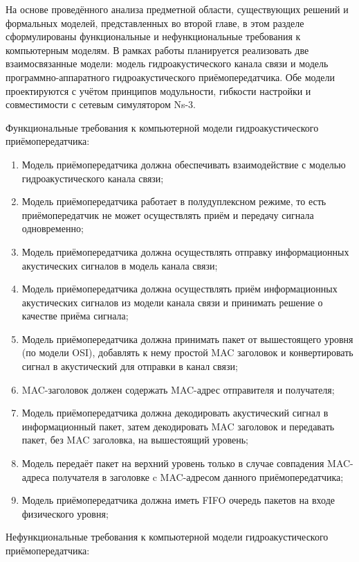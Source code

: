 На основе проведённого анализа предметной области, существующих решений
и формальных моделей, представленных во второй главе, в этом разделе
сформулированы функциональные и нефункциональные требования к
компьютерным моделям. В рамках работы планируется реализовать две
взаимосвязанные модели: модель гидроакустического канала связи и модель
программно-аппаратного гидроакустического приёмопередатчика. Обе модели
проектируются с учётом принципов модульности, гибкости настройки и
совместимости с сетевым симулятором Ns-3.

Функциональные требования к компьютерной модели гидроакустического
приёмопередатчика:

\begin{enumerate}
\def\labelenumi{\arabic{enumi}.}
\item
  Модель приёмопередатчика должна обеспечивать взаимодействие с моделью
  гидроакустического канала связи;
\item
  Модель приёмопередатчика работает в полудуплексном режиме, то есть
  приёмопередатчик не может осуществлять приём и передачу сигнала
  одновременно;
\item
  Модель приёмопередатчика должна осуществлять отправку информационных
  акустических сигналов в модель канала связи;
\item
  Модель приёмопередатчика должна осуществлять приём информационных
  акустических сигналов из модели канала связи и принимать решение о
  качестве приёма сигнала;
\item
  Модель приёмопередатчика должна принимать пакет от вышестоящего уровня
  (по модели OSI), добавлять к нему простой MAC заголовок и
  конвертировать сигнал в акустический для отправки в канал связи;
\item
  MAC-заголовок должен содержать MAC-адрес отправителя и получателя;
\item
  Модель приёмопередатчика должна декодировать акустический сигнал в
  информационный пакет, затем декодировать MAC заголовок и передавать
  пакет, без MAC заголовка, на вышестоящий уровень;
\item
  Модель передаёт пакет на верхний уровень только в случае совпадения
  MAC-адреса получателя в заголовке c MAC-адресом данного
  приёмопередатчика;
\item
  Модель приёмопередатчика должна иметь FIFO очередь пакетов на входе
  физического уровня;
\end{enumerate}

Нефункциональные требования к компьютерной модели гидроакустического
приёмопередатчика:

